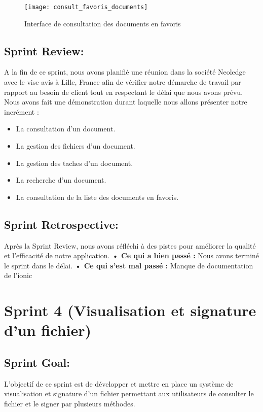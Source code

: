 \begin{figure}[H]
  \centering
  \texttt{[image: consult\_favoris\_documents]}
  \caption{Interface de consultation des documents en favoris}
  \label{fig:consult_favoris_documents}
\end{figure}



\subsection{Sprint Review:}
A la fin de ce sprint, nous avons planifié une réunion dans la société Neoledge avec le vise avis à Lille, France afin de vérifier notre démarche de travail par rapport au besoin de client tout en respectant le délai que nous avons prévu.
Nous avons fait une démonstration durant laquelle nous allons présenter notre incrément :
\begin{itemize}
  \item La consultation d'un document.
  \item La gestion des fichiers d'un document.
  \item La gestion des taches d'un document.
  \item La recherche d'un document.
  \item La consultation de la liste des documents en favoris.
\end{itemize}

\subsection{Sprint Retrospective:}

Après la Sprint Review, nous avons réfléchi à des pistes pour améliorer la qualité et l'efficacité de notre application.
\noindent\textbf{•	Ce qui a bien passé :}
Nous avons terminé le sprint dans le délai.
\noindent\textbf{•	Ce qui s'est mal passé :}
Manque de documentation de l'ionic 


\section{Sprint 4 (Visualisation et signature d'un fichier)}
\subsection{Sprint Goal:}
L'objectif de ce sprint est de développer et mettre en place un système de visualisation et signature d'un fichier permettant aux utilisateurs de consulter le fichier et le signer par plusieurs méthodes.


